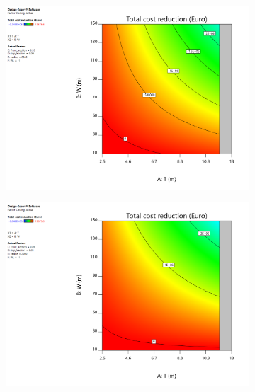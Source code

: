 \begin{figure}[h]
    \centering
    \begin{subfigure}[b]{0.475\textwidth}
        \centering
        \includegraphics[width=\textwidth]{figures/ComFLOW/Results DI1/costs/W_T_Costs_total_reduction_box_png.png}
        \caption[]%
        {{\small }}    
        \label{fig: opt }
    \end{subfigure}
    \hfill
    \begin{subfigure}[b]{0.475\textwidth}  
        \centering 
        \includegraphics[width=\textwidth]{figures/ComFLOW/Results DI1/costs/W_T_Costs_total_reduction_wedge_png.png}
        \caption[]%
        {{\small }}    
        \label{fig: opt }
    \end{subfigure}
    \caption{}
    \label{fig: }
\end{figure}

